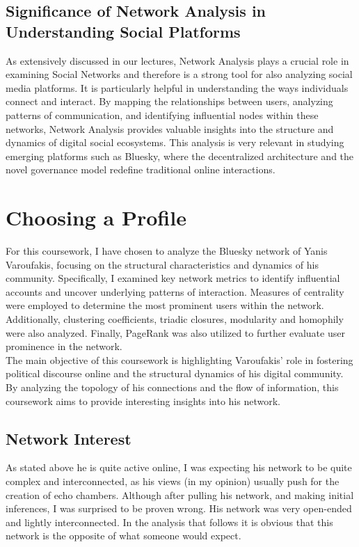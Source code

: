 \documentclass[
	a4paper, %
	12pt, %
	twoside, %
]{LTJournalArticle}
\begin{document}
\subsection{Significance of Network Analysis in Understanding Social Platforms}
As extensively discussed in our lectures, Network Analysis plays a crucial role in examining Social Networks and therefore is a strong tool for also analyzing social media platforms. It is particularly helpful in understanding the ways individuals connect and interact. By mapping the relationships between users, analyzing patterns of communication, and identifying influential nodes within these networks, Network Analysis provides valuable insights into the structure and dynamics of digital social ecosystems. This analysis is very relevant in studying emerging platforms such as Bluesky, where the decentralized architecture and the novel governance model redefine traditional online interactions. 

\section{Choosing a Profile}
For this coursework, I have chosen to analyze the Bluesky network of Yanis Varoufakis, focusing on the structural characteristics and dynamics of his community. Specifically, I examined key network metrics to identify influential accounts and uncover underlying patterns of interaction. Measures of centrality were employed to determine the most prominent users within the network. Additionally, clustering coefficients, triadic closures, modularity and homophily were also analyzed. Finally, PageRank was also utilized to further evaluate user prominence in the network.\\
The main objective of this coursework is highlighting Varoufakis' role in fostering political discourse online and the structural dynamics of his digital community. By analyzing the topology of his connections and the flow of information, this coursework aims to provide interesting insights into his network.

\subsection{Network Interest}
As stated above he is quite active online, I was expecting his network to be quite complex and interconnected, as his views (in my opinion) usually push for the creation of echo chambers. Although after pulling his network, and making initial inferences, I was surprised to be proven wrong. His network was very open-ended and lightly interconnected. In the analysis that follows it is obvious that this network is the opposite of what someone would expect. 
\end{document}
